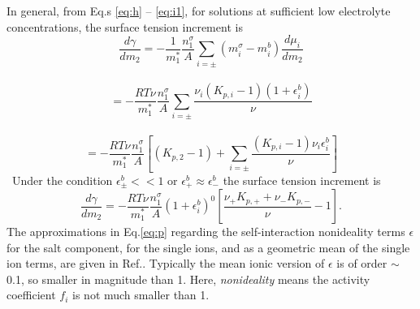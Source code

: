In general, from Eq.s \thinspace\ref{eq:h} -- \thinspace\ref{eq:i1}, for solutions at sufficient low electrolyte concentrations, the surface tension increment is 
\begin{equation}
\frac{d\gamma}{dm_2} = -\frac{1}{m_1^*}\frac{n_1^{\sigma}}{A}\sum_{i=\pm}(m_i^{\sigma} -m_{i}^{b})\frac{d\mu_i}{dm_2} \nonumber
\label{eq:gamma_m2}
\end{equation}\
\begin{equation}
= -\frac{RT\nu}{m_1^*}\frac{n_1^{\sigma}}{A}\sum_{i=\pm} \frac{{\nu_i}(K_{p,i}-1)(1+\epsilon_i^b)}{\nu} \nonumber
\label{eq:l}
\end{equation}\
\begin{equation}
= -\frac{RT\nu}{m_1^*}\frac{n_1^{\sigma}}{A}[(K_{p,2}-1)+\sum_{i=\pm} \frac{(K_{p,i}-1)\nu_i\epsilon_i^b}{\nu}]
\label{eq:n}
\end{equation}\
Under the condition $\epsilon_{\pm}^b << 1$ or $\epsilon_{+}^b \approx \epsilon_{-}^b$
the surface tension increment is 
\begin{equation}
\frac{d\gamma}{dm_2} 
= -\frac{RT\nu}{m_1^*}\frac{n_1^{\sigma}}{A} (1+\epsilon_i^b)^0 [\frac{\nu_+ K_{p,+} + \nu_- K_{p,-}}{\nu}-1].
\label{eq:p}
\end{equation}
The approximations in Eq.\thinspace\ref{eq:p} regarding the self-interaction {nonideality terms} $\epsilon$ for the salt component, 
for the single ions, and as a geometric mean of the single ion terms, are given in Ref.\cite{Pegram2006}.  
Typically the mean ionic version of $\epsilon$ is of order $\sim$ 0.1, so smaller in magnitude than 1. %
Here, \emph{nonideality} means the activity coefficient $f_i$ is not much smaller than 1.
%
%
%
%



